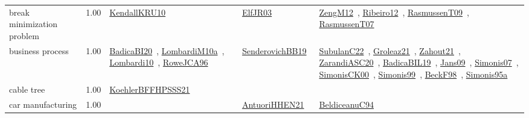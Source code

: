 {\begin{longtable}{p{3cm}r>{\raggedright\arraybackslash}p{6cm}>{\raggedright\arraybackslash}p{6cm}>{\raggedright\arraybackslash}p{8cm}}
\index{break minimization problem}\index{ApplicationAreas!break minimization problem}break minimization problem &  1.00 & \href{../works/KendallKRU10.pdf}{KendallKRU10}~\cite{KendallKRU10} & \href{../works/ElfJR03.pdf}{ElfJR03}~\cite{ElfJR03} & \href{../works/ZengM12.pdf}{ZengM12}~\cite{ZengM12}, \href{../works/Ribeiro12.pdf}{Ribeiro12}~\cite{Ribeiro12}, \href{../works/RasmussenT09.pdf}{RasmussenT09}~\cite{RasmussenT09}, \href{../works/RasmussenT07.pdf}{RasmussenT07}~\cite{RasmussenT07}\\
\index{business process}\index{ApplicationAreas!business process}business process &  1.00 & \href{../works/BadicaBI20.pdf}{BadicaBI20}~\cite{BadicaBI20}, \href{../works/LombardiM10a.pdf}{LombardiM10a}~\cite{LombardiM10a}, \href{../works/Lombardi10.pdf}{Lombardi10}~\cite{Lombardi10}, \href{../works/RoweJCA96.pdf}{RoweJCA96}~\cite{RoweJCA96} & \href{../works/SenderovichBB19.pdf}{SenderovichBB19}~\cite{SenderovichBB19} & \href{../works/SubulanC22.pdf}{SubulanC22}~\cite{SubulanC22}, \href{../works/Groleaz21.pdf}{Groleaz21}~\cite{Groleaz21}, \href{../works/Zahout21.pdf}{Zahout21}~\cite{Zahout21}, \href{../works/ZarandiASC20.pdf}{ZarandiASC20}~\cite{ZarandiASC20}, \href{../works/BadicaBIL19.pdf}{BadicaBIL19}~\cite{BadicaBIL19}, \href{../works/Jans09.pdf}{Jans09}~\cite{Jans09}, \href{../works/Simonis07.pdf}{Simonis07}~\cite{Simonis07}, \href{../works/SimonisCK00.pdf}{SimonisCK00}~\cite{SimonisCK00}, \href{../works/Simonis99.pdf}{Simonis99}~\cite{Simonis99}, \href{../works/BeckF98.pdf}{BeckF98}~\cite{BeckF98}, \href{../works/Simonis95a.pdf}{Simonis95a}~\cite{Simonis95a}\\
\index{cable tree}\index{ApplicationAreas!cable tree}cable tree &  1.00 & \href{../works/KoehlerBFFHPSSS21.pdf}{KoehlerBFFHPSSS21}~\cite{KoehlerBFFHPSSS21} &  & \\
\index{car manufacturing}\index{ApplicationAreas!car manufacturing}car manufacturing &  1.00 &  & \href{../works/AntuoriHHEN21.pdf}{AntuoriHHEN21}~\cite{AntuoriHHEN21} & \href{../works/BeldiceanuC94.pdf}{BeldiceanuC94}~\cite{BeldiceanuC94}\\

\end{longtable}}
